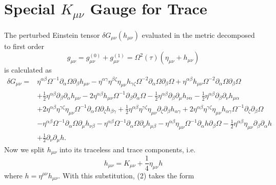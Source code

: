 \documentclass[10pt,letterpaper]{article}
\begin{document}
\section*{Special $K_{\mu\nu}$ Gauge for Trace}
The perturbed Einstein tensor $\delta  G_{\mu\nu}( h_{\mu\nu})$ evaluated in the metric decomposed to first order 
\begin{equation}
g_{\mu\nu} = g^{(0)}_{\mu\nu} + g^{(1)}_{\mu\nu} = \Omega^2(\tau)(\eta_{\mu\nu}+h_{\mu\nu})
\end{equation}
is calculated as 
\begin{align}
\delta G_{\mu\nu}={}&\eta^{\alpha \beta} \Omega^{-1} \partial_{\alpha}\Omega \partial_{\beta}h_{\mu \nu}
 -  \eta^{\alpha \gamma} \eta^{\beta \zeta} \eta_{\mu \nu} h_{\gamma \zeta} \Omega^{-2} \partial_{\alpha}\Omega \partial_{\beta}\Omega
 + \eta^{\alpha \beta} h_{\mu \nu} \Omega^{-2} \partial_{\alpha}\Omega \partial_{\beta}\Omega\nonumber\\
& + \tfrac{1}{2} \eta^{\alpha \beta} \partial_{\beta}\partial_{\alpha}h_{\mu \nu}
 - 2 \eta^{\alpha \beta} h_{\mu \nu} \Omega^{-1} \partial_{\beta}\partial_{\alpha}\Omega
 -  \tfrac{1}{2} \eta^{\alpha \beta} \partial_{\beta}\partial_{\mu}h_{\nu \alpha}
 -  \tfrac{1}{2} \eta^{\alpha \beta} \partial_{\beta}\partial_{\nu}h_{\mu \alpha}\nonumber\\
& + 2 \eta^{\alpha \beta} \eta^{\gamma \zeta} \eta_{\mu \nu} \Omega^{-1} \partial_{\alpha}\Omega \partial_{\zeta}h_{\beta \gamma}
 + \tfrac{1}{2} \eta^{\alpha \beta} \eta^{\gamma \zeta} \eta_{\mu \nu} \partial_{\zeta}\partial_{\beta}h_{\alpha \gamma}
 + 2 \eta^{\alpha \beta} \eta^{\gamma \zeta} \eta_{\mu \nu} h_{\alpha \gamma} \Omega^{-1} \partial_{\zeta}\partial_{\beta}\Omega\nonumber\\
& -  \eta^{\alpha \beta} \Omega^{-1} \partial_{\alpha}\Omega \partial_{\mu}h_{\nu \beta}
 -  \eta^{\alpha \beta} \Omega^{-1} \partial_{\alpha}\Omega \partial_{\nu}h_{\mu \beta}- \eta^{\alpha \beta} \eta_{\mu \nu} \Omega^{-1} \partial_{\alpha}h \partial_{\beta}\Omega -  \tfrac{1}{2} \eta^{\alpha \beta} \eta_{\mu \nu} \partial_{\beta}\partial_{\alpha}h\nonumber \\
& + \tfrac{1}{2} \partial_{\nu}\partial_{\mu}h.
\end{align}
Now we split $h_{\mu\nu}$ into its traceless and trace components, i.e.
\begin{equation}
	h_{\mu\nu} = K_{\mu\nu} + \frac 14 \eta_{\mu\nu}h
\end{equation}
where $h = \eta^{\mu\nu}h_{\mu\nu}$. With this substitution, (2) takes the form
\end{document}
